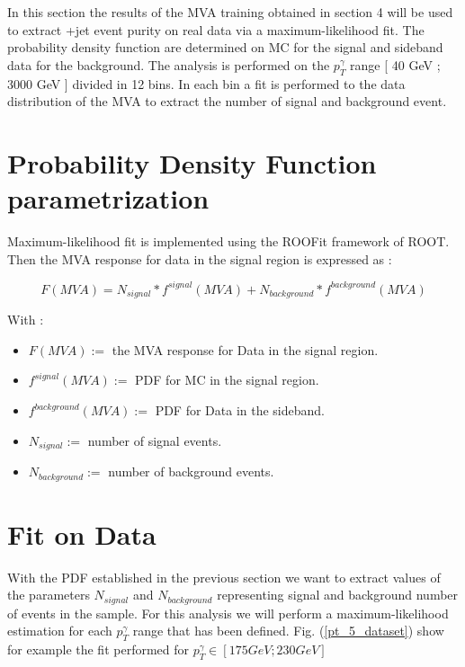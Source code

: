 \label{sec:unchapitre}

In this section the results of the MVA training obtained in section 4 will be used to extract \textgamma+jet event
purity on real data via a maximum-likelihood fit.
The probability density function are determined on MC for the signal and sideband data for the background.
The analysis is performed on the $p_T^\gamma$ range [ 40 GeV ; 3000 GeV ] divided in 12 bins.
In each bin a fit is performed to the data distribution of the MVA to extract the number of signal and background event.

\section{Probability Density Function parametrization}

Maximum-likelihood fit is implemented using the ROOFit framework of ROOT.
Then the MVA response for data in the signal region is expressed as : 

\begin{equation}
F(MVA) = N_{signal}*f^{signal}(MVA) + N_{background}*f^{background}(MVA)
\end{equation}

With : 
\begin{itemize}
	\item $F(MVA) :=$ the MVA response for Data in the signal region.
	\item $f^{signal}(MVA) :=$ PDF for MC in the signal region.
	\item $f^{background}(MVA) :=$ PDF for Data in the sideband. 
	\item $N_{signal} :=$ number of signal events.
	\item $N_{background} :=$ number of background events. 
\end{itemize}


\section{Fit on Data}

With the PDF established in the previous section we want to extract values of the parameters $N_{signal}$ and $N_{background}$ representing
signal and background number of events in the sample. For this analysis we will perform a maximum-likelihood estimation for
each $p_T^\gamma$ range that has been defined. Fig. (\ref{pt_5_dataset}) show for example the fit performed for
$p_T^\gamma \in [ 175 GeV ; 230 GeV ]$

